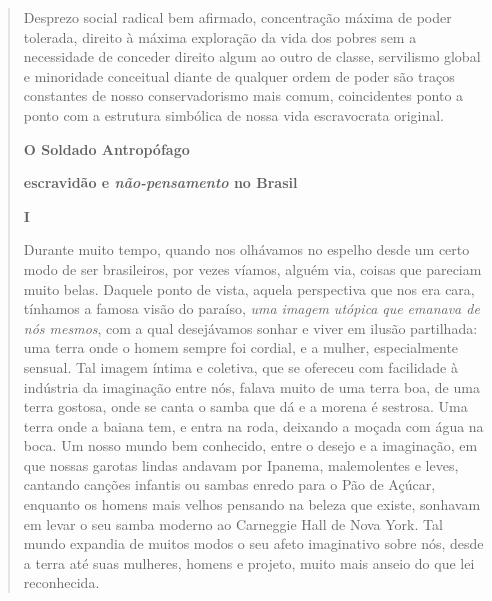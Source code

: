 \begin{quote}
Desprezo social radical bem afirmado, concentração máxima de poder
tolerada, direito à máxima exploração da vida dos pobres sem a
necessidade de conceder direito algum ao outro de classe, servilismo
global e minoridade conceitual diante de qualquer ordem de poder são
traços constantes de nosso conservadorismo mais comum, coincidentes
ponto a ponto com a estrutura simbólica de nossa vida escravocrata
original.

\textbf{O Soldado Antropófago}

\textbf{escravidão e \emph{não-pensamento} no Brasil}

\textbf{I}

Durante muito tempo, quando nos olhávamos no espelho desde um certo modo
de ser brasileiros, por vezes víamos, alguém via, coisas que pareciam
muito belas. Daquele ponto de vista, aquela perspectiva que nos era
cara, tínhamos a famosa visão do paraíso, \emph{uma imagem utópica}
\emph{que emanava de nós mesmos}, com a qual desejávamos sonhar e viver
em ilusão partilhada: uma terra onde o homem sempre foi cordial, e a
mulher, especialmente sensual. Tal imagem íntima e coletiva, que se
ofereceu com facilidade à indústria da imaginação entre nós, falava
muito de uma terra boa, de uma terra gostosa, onde se canta o samba que
dá e a morena é sestrosa. Uma terra onde a baiana tem, e entra na roda,
deixando a moçada com água na boca. Um nosso mundo bem conhecido, entre
o desejo e a imaginação, em que nossas garotas lindas andavam por
Ipanema, malemolentes e leves, cantando canções infantis ou sambas
enredo para o Pão de Açúcar, enquanto os homens mais velhos pensando na
beleza que existe, sonhavam em levar o seu samba moderno ao Carneggie
Hall de Nova York. Tal mundo expandia de muitos modos o seu afeto
imaginativo sobre nós, desde a terra até suas mulheres, homens e
projeto, muito mais anseio do que lei reconhecida.


\end{quote}
